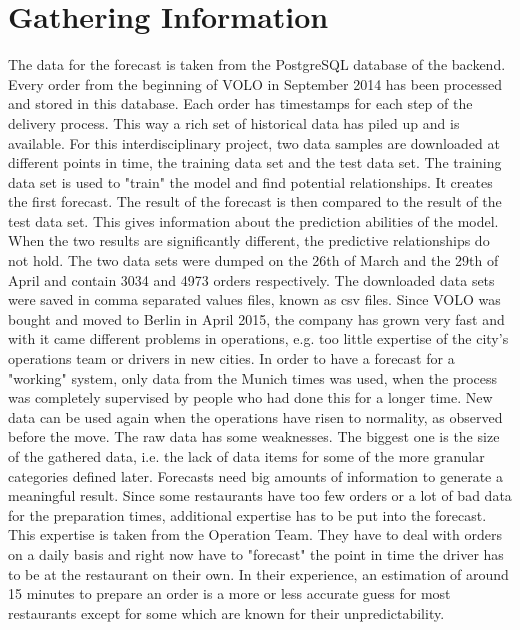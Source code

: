\section{Gathering Information}\label{section:Gathering Information}
The data for the forecast is taken from the PostgreSQL database of the backend. Every order from the beginning of VOLO in September 2014 has been processed and stored in this database. Each order has timestamps for each step of the delivery process. This way a rich set of historical data has piled up and is available. For this interdisciplinary project, two data samples are downloaded at different points in time, the training data set and the test data set. The training data set is used to "train" the model and find potential relationships. It creates the first forecast. The result of the forecast is then compared to the result of the test data set. This gives information about the prediction abilities of the model. When the two results are significantly different, the predictive relationships do not hold. The two data sets were dumped on the 26th of March and the 29th of April and contain 3034 and 4973 orders respectively. The downloaded data sets were saved in comma separated values files, known as csv files. Since VOLO was bought and moved to Berlin in April 2015, the company has grown very fast and with it came different problems in operations, e.g. too little expertise of the city's operations team or drivers in new cities. In order to have a forecast for a "working" system, only data from the Munich times was used, when the process was completely supervised by people who had done this for a longer time. New data can be used again when the operations have risen to normality, as observed before the move.\newline
The raw data has some weaknesses. The biggest one is the size of the gathered data, i.e. the lack of data items for some of the more granular categories defined later. Forecasts need big amounts of information to generate a meaningful result. Since some restaurants have too few orders or a lot of bad data for the preparation times, additional expertise has to be put into the forecast. This expertise is taken from the Operation Team. They have to deal with orders on a daily basis and right now have to "forecast" the point in time the driver has to be at the restaurant on their own. In their experience, an estimation of around 15 minutes to prepare an order is a more or less accurate guess for most restaurants except for some which are known for their unpredictability.\newline
